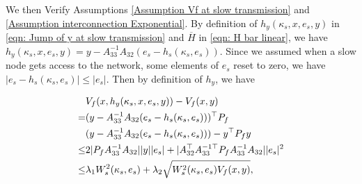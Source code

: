 We then Verify Assumptions \ref{Assumption Vf at slow transmission} and \ref{Assumption interconnection Exponential}. By definition of $h_y(\kappa_s,x,e_s,y)$ in \eqref{eqn: Jump of y at slow transmission} and $\overline{H}$ in \eqref{eqn: H bar linear}, we have $h_y(\kappa_s,x,e_s,y) =  y -A_{33}^{-1} A_{32} (e_s - h_s(\kappa_s, e_s)) $.
Since we assumed when a slow node gets access to the network, some elements of $e_s$ reset to zero, we have $|e_s - h_s(\kappa_s, e_s)| \leq |e_s|$.
Then by definition of $h_y$, we have 
\begin{small}
\begin{equation}
\setlength\abovedisplayskip{-5pt}%
    \begin{aligned}
        &V_f(x, h_y(\kappa_s,x,e_s,y)) - V_f(x,y) \\
        = & (y -A_{33}^{-1} A_{32} (e_s - h_s(\kappa_s, e_s)))^\top P_f \\
            &(y -A_{33}^{-1} A_{32} (e_s - h_s(\kappa_s, e_s))) - y^\top P_f y  \\
        \leq & 2 | P_f A_{33}^{-1} A_{32}| |y| |e_s| + |A_{32}^\top A_{33}^{-1\top} P_f A_{33}^{-1} A_{32}| |e_s|^2 \\
        \leq & \lambda_1 W_s^2(\kappa_s, e_s) + \lambda_2 \sqrt{W_s^2(\kappa_s, e_s) V_f(x,y)} ,
    \end{aligned}
    \label{eqn: lambda_1 and lambda_2}
\end{equation}
\end{small}

